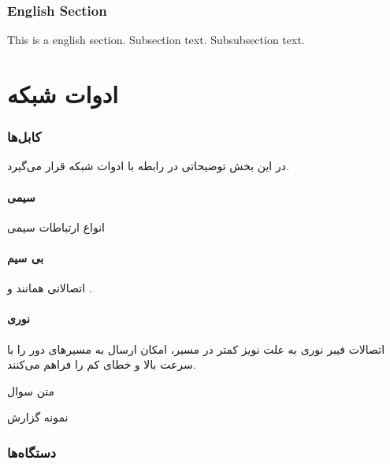 \documentclass{../UTNetLabFa}
\begin{document}
\begin{otherlanguage}{english}
	\section{English Section}
	This is a english section.%
	Subsection text.
	Subsubsection text.
\end{otherlanguage}

\part{ادوات شبکه}
\section{کابل‌ها}
در این بخش توضیحاتی در رابطه با ادوات شبکه قرار می‌گیرد.
\subsection{سیمی}
انواع ارتباطات سیمی

\subsection{بی سیم}
	اتصالاتی همانند  و .
\subsection{نوری}
    اتصالات فیبر نوری به علت نویز کمتر در مسیر، امکان ارسال به مسیرهای دور را با سرعت بالا و خطای کم را فراهم می‌کنند.
\begin{question}
    \item متن سوال
\end{question}

\begin{report}
	\item نمونه گزارش
\end{report}

\section{دستگاه‌ها}
\end{document}
